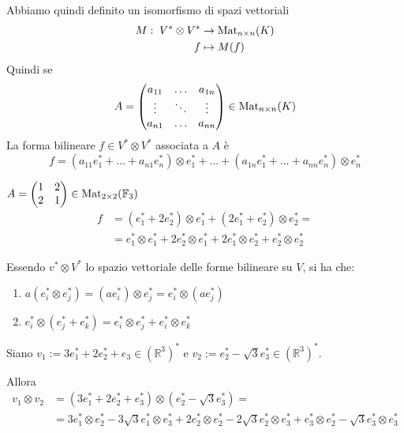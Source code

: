 \documentclass[../main.tex]{subfiles}
\begin{document}
Abbiamo quindi definito un isomorfismo di spazi vettoriali
\begin{align*}
    M : \;  V^* \otimes V^* & \rightarrow \operatorname{Mat}_{n \times n}(K) \\
    f                       & \mapsto M(f)
\end{align*}
Quindi se
\begin{equation*}
    A = \begin{pmatrix}
        a_{11} & \ldots & a_{1n} \\
        \vdots & \ddots & \vdots \\
        a_{n1} & \ldots & a_{nn}
    \end{pmatrix} \in \operatorname{Mat}_{n \times n}(K)
\end{equation*}
La forma bilineare $f \in V^* \otimes V^*$ associata a $A$ è
\begin{equation*}
    f = (a_{11} e_1^* + \ldots + a_{n1}e_n^*) \otimes e_1^* +
    \ldots
    + (a_{1n} e_1^* + \ldots + a_{nn}e_n^*) \otimes e_n^*
\end{equation*}
\begin{example}
    $A = \begin{pmatrix}
            1 & 2 \\
            2 & 1
        \end{pmatrix} \in \operatorname{Mat}_{2 \times 2}(\mathbb{F}_3)$
    \begin{align*}
        f & = (e_1^* + 2e_2^*) \otimes e_1^* + (2e_1^* + e_2^*) \otimes e_2^* =                        \\
          & = e_1^* \otimes e_1^* + 2 e_2^* \otimes e_1^* + 2e_1^* \otimes e_2^* + e_2^* \otimes e_2^*
    \end{align*}
\end{example}
\begin{note}
    Essendo $v^* \otimes V^*$ lo spazio vettoriale delle forme bilineare su $V$, si ha che:
    \begin{enumerate}
        \item $a(e_i^* \otimes e_j^*) = (a e_i^*) \otimes e_j^* = e_i^* \otimes (ae_j^*)$
        \item $e_i^* \otimes (e_j^* + e_k^*) = e_i^* \otimes e_j^* + e_i^* \otimes e_k^*$
    \end{enumerate}
\end{note}

\begin{example}
    Siano $v_1 := 3e_1^* + 2e_2^* + e_3 \in (\mathbb{R}^3)^*$ e $v_2 := e_2^* - \sqrt{3} e_3^* \in (\mathbb{R}^3)^*$.

    Allora
    \begin{align*}
        v_1 \otimes v_2 & = (3e_1^* + 2e_2^* + e_3^*) \otimes (e_2^* - \sqrt{3} e_3^*) =                                                                                                     \\
                        & = 3e_1^* \otimes e_2^* - 3\sqrt{3} e_1^* \otimes e_3^* + 2e_2^* \otimes e_2^* - 2\sqrt{3} e_2^* \otimes e_3^* + e_3^* \otimes e_2^* - \sqrt{3} e_3^* \otimes e_3^*
    \end{align*}
\end{example}
\end{document}

